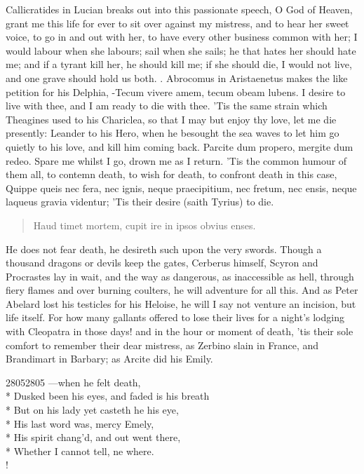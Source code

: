Callicratides in Lucian breaks out into this passionate speech, O
God of Heaven, grant me this life for ever to sit over against my
mistress, and to hear her sweet voice, to go in and out with her, to
have every other business common with her; I would labour when she
labours; sail when she sails; he that hates her should hate me; and if
a tyrant kill her, he should kill me; if she should die, I would not
live, and one grave should hold us both. . Abrocomus in Aristaenetus makes the like
petition for his Delphia, -Tecum vivere amem, tecum obeam lubens.
I desire to live with thee, and I am ready to die with thee. 'Tis the
same strain which Theagines used to his Chariclea, so that I may but
enjoy thy love, let me die presently: Leander to his Hero, when he
besought the sea waves to let him go quietly to his love, and kill him
coming back. Parcite dum propero, mergite dum redeo. Spare me
whilst I go, drown me as I return. 'Tis the common humour of them all,
to contemn death, to wish for death, to confront death in this case,
Quippe queis nec fera, nec ignis, neque praecipitium, nec fretum, nec
ensis, neque laqueus gravia videntur; 'Tis their desire (saith Tyrius)
to die.

\begin{latin}
\begin{verse}
Haud timet mortem, cupit ire in ipsos
obvius enses.
\end{verse}
\end{latin}

He does not fear death, he desireth such upon the very swords. Though a
thousand dragons or devils keep the gates, Cerberus himself, Scyron and
Procrastes lay in wait, and the way as dangerous, as inaccessible as
hell, through fiery flames and over burning coulters, he will adventure
for all this. And as Peter Abelard lost his testicles for his
Heloise, he will I say not venture an incision, but life itself. For
how many gallants offered to lose their lives for a night's lodging
with Cleopatra in those days! and in the hour or moment of death, 'tis
their sole comfort to remember their dear mistress, as Zerbino
slain in France, and Brandimart in Barbary; as Arcite did his Emily.
%
{\gothfont%
\begin{versewithlinenos}{2}{2805}{2805}%
---when he felt death,\\*
Dusked been his eyes, and faded is his breath\\*
But on his lady yet casteth he his eye,\\*
His last word was, mercy Emely,\\*
His spirit chang'd, and out went there,\\*
Whether I cannot tell, ne where.\\!
\end{versewithlinenos}%
}%

